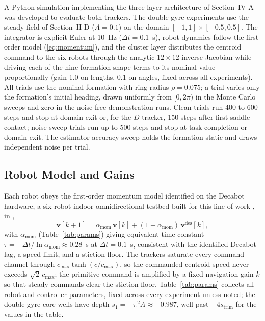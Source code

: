 \documentclass[lettersize,journal]{IEEEtran}
\begin{document}
A Python simulation implementing the three-layer architecture of
Section~\mbox{IV-A} was developed to evaluate both trackers.
The double-gyre experiments use the steady field of
Section~\mbox{II-D} ($A = 0.1$) on the domain $[-1, 1] \times
[-0.5, 0.5]$. The integrator is explicit Euler at 10~Hz ($\Delta t =
0.1$~s), robot dynamics follow the first-order model
(\ref{eq:momentum}), and the cluster layer distributes the centroid
command to the six robots through the analytic $12 \times 12$ inverse
Jacobian while driving each of the nine formation shape terms to its
nominal value proportionally (gain 1.0 on lengths, 0.1 on angles, fixed
across all experiments). All trials use the nominal formation with ring
radius $\rho = 0.075$; a trial varies only the formation's initial
heading, drawn uniformly from $[0, 2\pi)$ in the Monte Carlo sweeps and
zero in the noise-free demonstration runs. Clean trials run 400 to 600
steps and stop at domain exit or, for the $D$ tracker, 150 steps after
first saddle contact; noise-sweep trials run up to 500 steps and stop
at task completion or domain exit. The estimator-accuracy sweep holds
the formation static and draws independent noise per trial.

\subsection{Robot Model and Gains}
\label{sec:robot_model}

Each robot obeys the first-order momentum model identified on the
Decabot hardware, a six-robot indoor omnidirectional testbed built for
this line of work \cite{32,33}, in \cite{14},
\begin{equation}
    \mathbf{v}[k+1] = \alpha_{\text{mom}}\,\mathbf{v}[k]
    + (1 - \alpha_{\text{mom}})\,\mathbf{v}^{\text{des}}[k],
    \label{eq:momentum}
\end{equation}
with $\alpha_{\text{mom}}$ (Table~\ref{tab:params}) giving equivalent
time constant $\tau = -\Delta t/\ln\alpha_{\text{mom}} \approx 0.28$~s
at $\Delta t = 0.1$~s, consistent with the identified Decabot lag, a
speed limit, and a stiction floor.
The trackers saturate every command channel through
$c_{\max}\tanh(c/c_{\max})$, so the commanded centroid speed never
exceeds $\sqrt{2}\,c_{\max}$; the primitive command is amplified by a
fixed navigation gain $k$ so that steady commands clear the stiction
floor. Table~\ref{tab:params} collects all robot and controller
parameters, fixed across every experiment unless noted; the double-gyre
core wells have depth $s_1 = -\pi^2 A \approx -0.987$, well past
$-4s_{\mathrm{trim}}$ for the values in the table.
\end{document}

